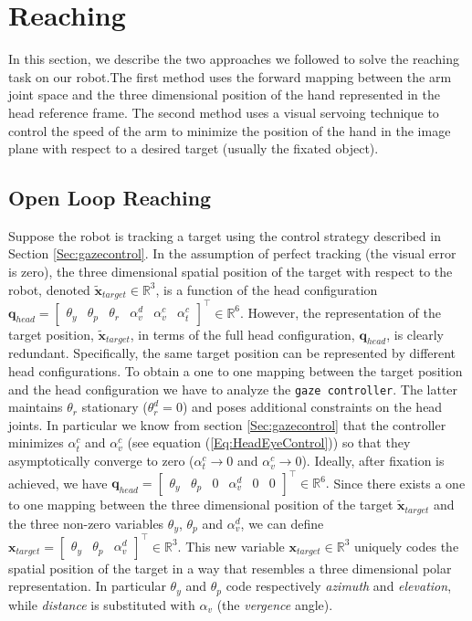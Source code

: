 \section{Reaching}
\label{sec:reaching}

In this section, we describe the two approaches we followed to solve
the reaching task on our robot.The first method 
uses the forward mapping between the arm joint space and the three 
dimensional position of the hand represented in the head reference 
frame. The second method uses a visual servoing technique to control the 
speed of the arm to minimize the position of the hand in the 
image plane with respect to a desired target (usually the fixated object).

\subsection{Open Loop Reaching}
%
Suppose the robot is tracking a target using the control strategy described 
in Section \ref{Sec:gazecontrol}. In the assumption of perfect 
tracking (the visual error is zero), the three dimensional spatial position 
of the target with respect to the robot, denoted $\tilde {\mathbf x}_{target} 
\in \mathbb R^3$, 
is a function of the head configuration $\mathbf q_{head} =
\begin{bmatrix} \theta_y & \theta_p & \theta_r & \alpha_v^d & \alpha_v^c & \alpha_t^c \end{bmatrix}^\top \in \mathbb R^6$.
However, the representation of the target position, 
$\tilde {\mathbf x}_{target}$, in terms of the full head configuration, 
$\mathbf q_{head}$, is clearly redundant.
Specifically, the same target position can be represented by different 
head configurations. To obtain a one to one mapping between the target 
position and the head configuration we have to analyze the 
{\tt gaze controller}. The latter maintains $\theta_r$ stationary 
($\theta_r^d = 0$) and poses additional constraints on the head joints. 
In particular we know from section \ref{Sec:gazecontrol} that the 
controller minimizes $\alpha_t^c$ and $\alpha^c_v$ (see equation 
(\ref{Eq:HeadEyeControl})) so that they asymptotically
converge to zero ($\alpha_t^c \rightarrow 0$ and 
$\alpha_v^c \rightarrow 0$). Ideally, after 
fixation is achieved, we have $
\mathbf {q}_{head}=
\begin{bmatrix} \theta_y & \theta_p & 0 & \alpha_v^d & 0 & 0 \end{bmatrix}^\top \in \mathbb R^6.
$
%
Since there exists a one to one mapping between the three dimensional 
position of the target 
$\tilde {\mathbf x}_{target}$ and the three non-zero variables 
$\theta_y$, $\theta_p$ and $\alpha_v^d$, we can define $
\mathbf x_{target}=
\begin{bmatrix} \theta_y & \theta_p & \alpha_v^d\end{bmatrix}^\top \in \mathbb R^3.
$
%
This new variable $\mathbf x_{target} \in \mathbb R^3$ uniquely codes the 
spatial position of the target in a way that resembles a three dimensional 
polar representation. In particular $\theta_y$ and $\theta_p$ code 
respectively \emph{azimuth} and \emph{elevation}, while \emph{distance} is 
substituted with $\alpha_v$ (the \emph{vergence} angle). 

